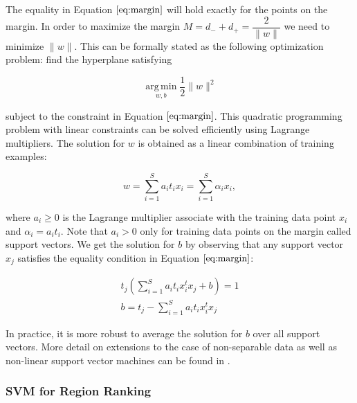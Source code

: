 \documentclass{SMBV13}
\begin{document}
The equality in Equation $\ref{eq:margin}$ will hold exactly for the points on the margin. In order to maximize the margin $M = d_- + d_+ = \dfrac{2}{\|w\|}$ we need to minimize $\|w\|$. This can be formally stated as the following optimization problem: find the hyperplane satisfying

\begin{equation}
\operatorname*{arg\,min}_{w, b} \dfrac{1}{2}\|w\|^2
\end{equation}

subject to the constraint in Equation $\ref{eq:margin}$. This quadratic programming problem with linear constraints can be solved efficiently using Lagrange multipliers. The solution for $w$ is obtained as a linear combination of training examples:

\begin{equation}
w = \sum\limits_{i = 1}^{S} a_i t_i x_i = \sum\limits_{i = 1}^{S} \alpha_ix_i,
\end{equation}

where $a_i \geq 0$ is the Lagrange multiplier associate with the training data point $x_i$ and $\alpha_i = a_it_i$. Note that $a_i > 0$ only for training data points on the margin called support vectors. We get the solution for $b$ by observing that any support vector $x_j$ satisfies the equality condition in Equation $\ref{eq:margin}$:

\begin{equation}
\begin{array}{lcl}
t_j \left( \sum\limits_{i = 1}^{S} a_i t_i x_i^t x_j + b \right) = 1\\
b = t_j - \sum\limits_{i = 1}^{S} a_i t_i x_i^t x_j
\end{array}
\end{equation}

In practice, it is more robust to average the solution for $b$ over all support vectors. More detail on extensions to the case of non-separable data as well as non-linear support vector machines can be found in \cite{burges1998tutorial}.


\subsubsection{SVM for Region Ranking}
\end{document}
